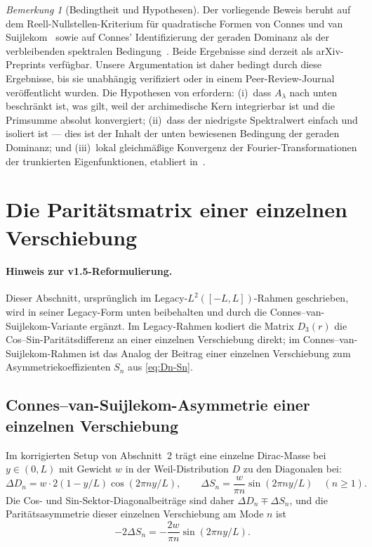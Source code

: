 \documentclass[11pt,a4paper]{article}
\theoremstyle{remark}
\newtheorem{remark}[remark]{Bemerkung}
\theoremstyle{plain}
\begin{document}
\begin{remark}[Bedingtheit und Hypothesen]
\label{rem:conditioning}
Der vorliegende Beweis beruht auf dem Reell-Nullstellen-Kriterium für quadratische Formen von Connes und van Suijlekom~\cite{ConnesvS2025} sowie auf Connes' Identifizierung der geraden Dominanz als der verbleibenden spektralen Bedingung~\cite{Connes2026}. Beide Ergebnisse sind derzeit als arXiv-Preprints verfügbar. Unsere Argumentation ist daher bedingt durch diese Ergebnisse, bis sie unabhängig verifiziert oder in einem Peer-Review-Journal veröffentlicht wurden.
Die Hypothesen von  erfordern: (i)~dass $A_\lambda$ nach unten beschränkt ist, was gilt, weil der archimedische Kern integrierbar ist und die Primsumme absolut konvergiert; (ii)~dass der niedrigste Spektralwert einfach und isoliert ist --- dies ist der Inhalt der unten bewiesenen Bedingung der geraden Dominanz; und (iii)~lokal gleichmäßige Konvergenz der Fourier-Transformationen der trunkierten Eigenfunktionen, etabliert in~\cite[Abschnitt~4]{Connes2026}.
\end{remark}

\section{Die Paritätsmatrix einer einzelnen Verschiebung}
\label{sec:parity-matrix}

\paragraph{Hinweis zur v1.5-Reformulierung.} Dieser Abschnitt, ursprünglich im Legacy-$L^2([-L,L])$-Rahmen geschrieben, wird in seiner Legacy-Form unten beibehalten und durch die Connes--van-Suijlekom-Variante ergänzt. Im Legacy-Rahmen kodiert die Matrix $D_3(r)$ die Cos--Sin-Paritätsdifferenz an einer einzelnen Verschiebung direkt; im Connes--van-Suijlekom-Rahmen ist das Analog der Beitrag einer einzelnen Verschiebung zum Asymmetriekoeffizienten $S_n$ aus \eqref{eq:Dn-Sn}.

\subsection{Connes--van-Suijlekom-Asymmetrie einer einzelnen Verschiebung}
\label{subsec:parity-cvs}

Im korrigierten Setup von Abschnitt~2 trägt eine einzelne Dirac-Masse bei $y\in(0,L)$ mit Gewicht $w$ in der Weil-Distribution $D$ zu den Diagonalen bei:
\[
  \Delta D_n = w\cdot 2(1-y/L)\cos(2\pi n y/L),
  \qquad
  \Delta S_n = \frac{w}{\pi n}\sin(2\pi n y/L) \quad (n\geq 1).
\]
Die Cos- und Sin-Sektor-Diagonalbeiträge sind daher $\Delta D_n \mp \Delta S_n$, und die Paritätsasymmetrie dieser einzelnen Verschiebung am Mode $n$ ist
\begin{equation}
\label{eq:single-shift-asymmetry}
  -2\Delta S_n = -\frac{2w}{\pi n}\sin(2\pi n y/L).
\end{equation}
\end{document}

